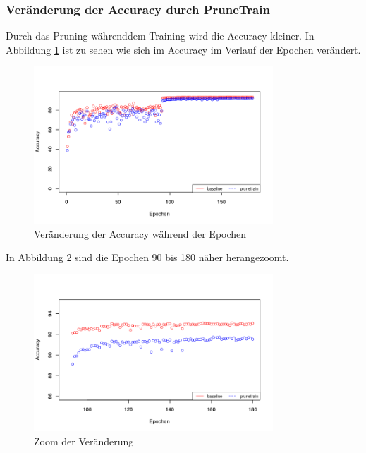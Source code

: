 \subsubsection{Veränderung der Accuracy durch PruneTrain}

Durch das Pruning währenddem Training wird die Accuracy kleiner. In Abbildung \ref{abb:PTaccuracy} ist zu sehen wie sich im Accuracy im Verlauf der Epochen verändert.  

\begin{figure}[h]
 \centering
 \includegraphics[width=0.8\textwidth]{KapitelPartB/Images/PTaccuracy.png}
 \caption{Veränderung der Accuracy während der Epochen}
 \label{abb:PTaccuracy}
\end{figure}

In Abbildung \ref{abb:PTaccuracyzoom} sind die Epochen 90 bis 180 näher herangezoomt.

\begin{figure}[h]
 \centering
 \includegraphics[width=0.8\textwidth]{KapitelPartB/Images/PTaccuracyzoom.png}
 \caption{Zoom der Veränderung}
 \label{abb:PTaccuracyzoom}
\end{figure}

